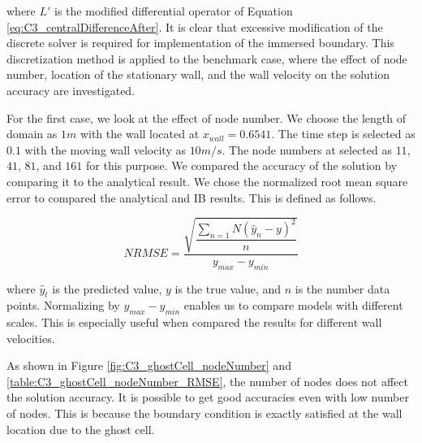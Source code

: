 where $L'$ is the modified differential operator of Equation \eqref{eq:C3_centralDifferenceAfter}. It is clear that excessive modification of the discrete solver is required for implementation of the immersed boundary. This discretization method is applied to the benchmark case, where the effect of node number, location of the stationary wall, and the wall velocity on the solution accuracy are investigated.

For the first case, we look at the effect of node number. We choose the length of domain as $1m$ with the wall located at $x_{wall} = 0.6541$. The time step is selected as $0.1$ with the moving wall velocity as $10 m/s$. The node numbers at selected as $11$, $41$, $81$, and $161$ for this purpose. We compared the accuracy of the solution by comparing it to the analytical result. We chose the normalized root mean square error to compared the analytical and IB results. This is defined as follows.

\begin{equation*}
	NRMSE = \dfrac{\sqrt{\dfrac{\sum_{n=1}{N} \left( \hat{y}_n - y \right)^2}{n}}}{y_{max} - y_{min}}
\end{equation*}

where $\hat{y}_t$ is the predicted value, $y$ is the true value, and $n$ is the number data points. Normalizing by $y_{max} - y_{min}$ enables us to compare models with different scales. This is especially useful when compared the results for different wall velocities.

As shown in Figure \ref{fig:C3_ghostCell_nodeNumber} and \ref{table:C3_ghostCell_nodeNumber_RMSE}, the number of nodes does not affect the solution accuracy. It is possible to get good accuracies even with low number of nodes. This is because the boundary condition is exactly satisfied at the wall location due to the ghost cell.

